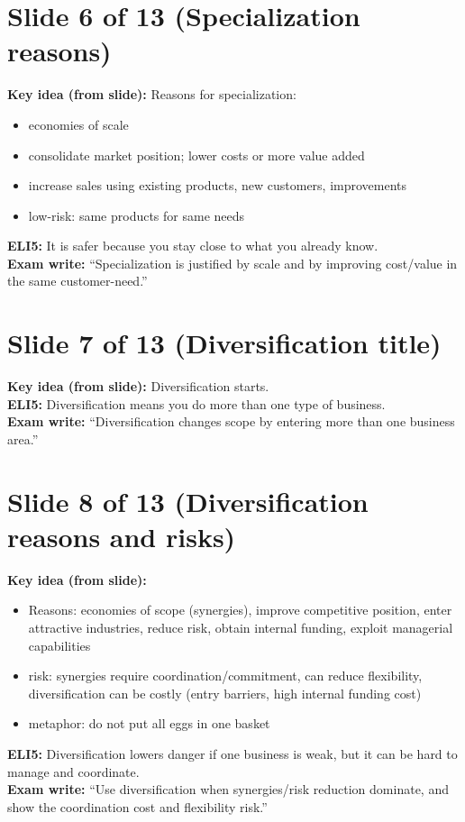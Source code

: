 \documentclass[11pt,a4paper]{article}
\begin{document}
\section*{Slide 6 of 13 (Specialization reasons)}
\textbf{Key idea (from slide):} Reasons for specialization:
\begin{itemize}
  \item economies of scale
  \item consolidate market position; lower costs or more value added
  \item increase sales using existing products, new customers, improvements
  \item low-risk: same products for same needs
\end{itemize}
\textbf{ELI5:} It is safer because you stay close to what you already know.\\
\textbf{Exam write:} ``Specialization is justified by scale and by improving cost/value in the same customer-need.''

\section*{Slide 7 of 13 (Diversification title)}
\textbf{Key idea (from slide):} Diversification starts.\\
\textbf{ELI5:} Diversification means you do more than one type of business.\\
\textbf{Exam write:} ``Diversification changes scope by entering more than one business area.''

\section*{Slide 8 of 13 (Diversification reasons and risks)}
\textbf{Key idea (from slide):}
\begin{itemize}
  \item Reasons: economies of scope (synergies), improve competitive position, enter attractive industries,
  reduce risk, obtain internal funding, exploit managerial capabilities
  \item risk: synergies require coordination/commitment, can reduce flexibility, diversification can be costly (entry barriers, high internal funding cost)
  \item metaphor: do not put all eggs in one basket
\end{itemize}
\textbf{ELI5:} Diversification lowers danger if one business is weak, but it can be hard to manage and coordinate.\\
\textbf{Exam write:} ``Use diversification when synergies/risk reduction dominate, and show the coordination cost and flexibility risk.''
\end{document}
